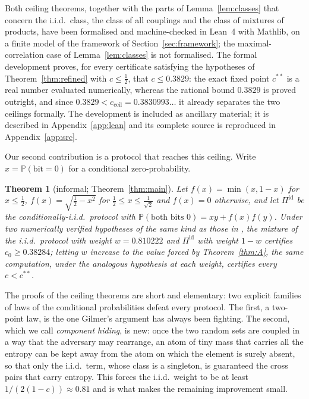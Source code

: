 \documentclass[11pt,a4paper]{article}
\newtheorem{theorem}{Theorem}[section]
\theoremstyle{definition}
\theoremstyle{remark}
\newcommand{\Prob}{\mathbb{P}}
\newcommand{\id}{\mathrm{id}}
\begin{document}
Both ceiling theorems, together with the parts of Lemma~\ref{lem:classes} that concern the
i.i.d.\ class, the class of all couplings and the class of mixtures of products, have been
formalised and machine-checked in Lean~4 with Mathlib, on a finite model of the framework of
Section~\ref{sec:framework}; the maximal-correlation case of Lemma~\ref{lem:classes} is not
formalised. The formal development proves, for every certificate satisfying the hypotheses of
Theorem~\ref{thm:refined} with $c\le\tfrac12$, that $c\le0.3829$: the exact fixed point
$c^{**}$ is a real number evaluated numerically, whereas the rational bound $0.3829$ is
proved outright, and since $0.3829<c_{\mathrm{ceil}}=0.3830993\ldots$ it already separates the
two ceilings formally. The development is included as ancillary material; it is described in
Appendix~\ref{app:lean} and its complete source is reproduced in Appendix~\ref{app:src}.

Our second contribution is a protocol that reaches this ceiling. Write $x=\Prob(\text{bit}=0)$ for a conditional zero-probability.

\begin{theorem}[informal; Theorem~\ref{thm:main}]\label{thm:B}
Let $f(x)=\min(x,1-x)$ for $x\le\frac12$, $f(x)=\sqrt{\frac12-x^2}$ for $\frac12\le x\le\frac1{\sqrt2}$ and $f(x)=0$ otherwise, and let $\Pi^{\id}$ be the conditionally-i.i.d.\ protocol with $\Prob(\text{both bits }0)=xy+f(x)f(y)$. Under two numerically verified hypotheses of the same kind as those in \cite{Liu}, the mixture of the i.i.d.\ protocol with weight $w=0.810222$ and $\Pi^{\id}$ with weight $1-w$ certifies $c_0\ge0.38284$; letting $w$ increase to the value forced by Theorem~\ref{thm:A}, the same computation, under the analogous hypothesis at each weight, certifies every $c<c^{**}$.
\end{theorem}

The proofs of the ceiling theorems are short and elementary: two explicit families of laws of the conditional probabilities defeat every protocol. The first, a two-point law, is the one Gilmer's argument has always been fighting. The second, which we call \emph{component hiding}, is new: once the two random sets are coupled in a way that the adversary may rearrange, an atom of tiny mass that carries all the entropy can be kept away from the atom on which the element is surely absent, so that only the i.i.d.\ term, whose class is a singleton, is guaranteed the cross pairs that carry entropy. This forces the i.i.d.\ weight to be at least $1/(2(1-c))\approx0.81$ and is what makes the remaining improvement small.
\end{document}
